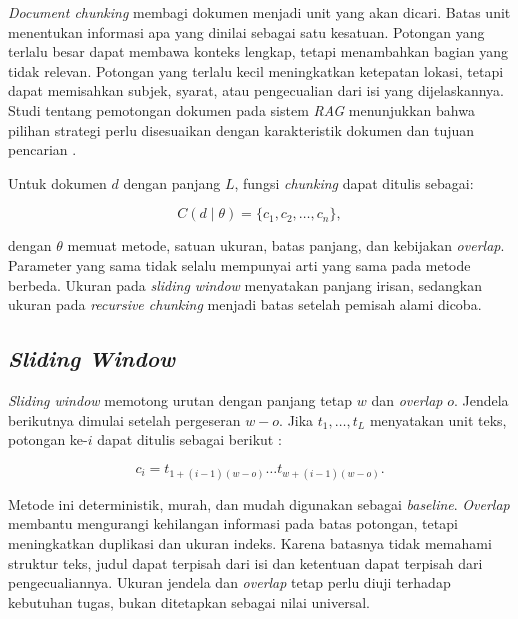 \emph{Document chunking} membagi dokumen menjadi unit yang akan dicari. Batas unit menentukan informasi apa yang dinilai sebagai satu kesatuan. Potongan yang terlalu besar dapat membawa konteks lengkap, tetapi menambahkan bagian yang tidak relevan. Potongan yang terlalu kecil meningkatkan ketepatan lokasi, tetapi dapat memisahkan subjek, syarat, atau pengecualian dari isi yang dijelaskannya. Studi tentang pemotongan dokumen pada sistem \emph{RAG} menunjukkan bahwa pilihan strategi perlu disesuaikan dengan karakteristik dokumen dan tujuan pencarian \parencite{aaditkshirsagarEnhancingRAGPerformance2024,stablerImpactChunkingDomainSpecific2025}.

Untuk dokumen $d$ dengan panjang $L$, fungsi \emph{chunking} dapat ditulis sebagai:

\begin{equation}
    C(d\mid\theta)=\{c_1,c_2,\ldots,c_n\},
\end{equation}

dengan $\theta$ memuat metode, satuan ukuran, batas panjang, dan kebijakan \emph{overlap}. Parameter yang sama tidak selalu mempunyai arti yang sama pada metode berbeda. Ukuran pada \emph{sliding window} menyatakan panjang irisan, sedangkan ukuran pada \emph{recursive chunking} menjadi batas setelah pemisah alami dicoba.

\subsection{\emph{Sliding Window}}

\emph{Sliding window} memotong urutan dengan panjang tetap $w$ dan \emph{overlap} $o$. Jendela berikutnya dimulai setelah pergeseran $w-o$. Jika $t_1,\ldots,t_L$ menyatakan unit teks, potongan ke-$i$ dapat ditulis sebagai berikut \parencite{aaditkshirsagarEnhancingRAGPerformance2024}:

\begin{equation}
    c_i=t_{1+(i-1)(w-o)}\ldots t_{w+(i-1)(w-o)}.
\end{equation}

Metode ini deterministik, murah, dan mudah digunakan sebagai \emph{baseline}. \emph{Overlap} membantu mengurangi kehilangan informasi pada batas potongan, tetapi meningkatkan duplikasi dan ukuran indeks. Karena batasnya tidak memahami struktur teks, judul dapat terpisah dari isi dan ketentuan dapat terpisah dari pengecualiannya. Ukuran jendela dan \emph{overlap} tetap perlu diuji terhadap kebutuhan tugas, bukan ditetapkan sebagai nilai universal.

